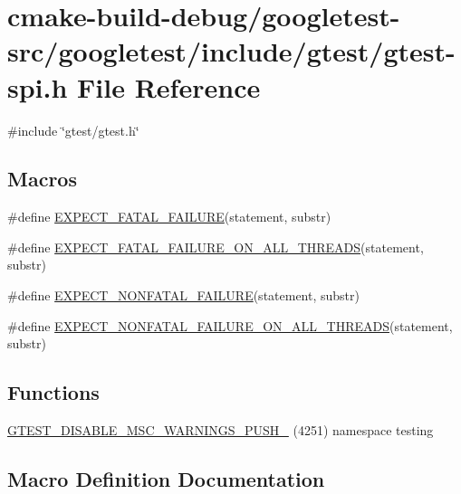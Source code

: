 \hypertarget{gtest-spi_8h}{}\section{cmake-\/build-\/debug/googletest-\/src/googletest/include/gtest/gtest-\/spi.h File Reference}
\label{gtest-spi_8h}
{\ttfamily \#include \char`\"{}gtest/gtest.\+h\char`\"{}}\newline
\subsection*{Macros}
\begin{DoxyCompactItemize}
\item 
\#define \mbox{\hyperlink{gtest-spi_8h_a819a3fd7f8b8cf24b6f1b3a26708973d}{E\+X\+P\+E\+C\+T\+\_\+\+F\+A\+T\+A\+L\+\_\+\+F\+A\+I\+L\+U\+RE}}(statement,  substr)
\item 
\#define \mbox{\hyperlink{gtest-spi_8h_ad8aac5bc859b2ddc07583636ae4f45cf}{E\+X\+P\+E\+C\+T\+\_\+\+F\+A\+T\+A\+L\+\_\+\+F\+A\+I\+L\+U\+R\+E\+\_\+\+O\+N\+\_\+\+A\+L\+L\+\_\+\+T\+H\+R\+E\+A\+DS}}(statement,  substr)
\item 
\#define \mbox{\hyperlink{gtest-spi_8h_a8376fd6821bd88fd806697355e79e138}{E\+X\+P\+E\+C\+T\+\_\+\+N\+O\+N\+F\+A\+T\+A\+L\+\_\+\+F\+A\+I\+L\+U\+RE}}(statement,  substr)
\item 
\#define \mbox{\hyperlink{gtest-spi_8h_a9f4cf1f150fe9facfc4cbf0bae646ee9}{E\+X\+P\+E\+C\+T\+\_\+\+N\+O\+N\+F\+A\+T\+A\+L\+\_\+\+F\+A\+I\+L\+U\+R\+E\+\_\+\+O\+N\+\_\+\+A\+L\+L\+\_\+\+T\+H\+R\+E\+A\+DS}}(statement,  substr)
\end{DoxyCompactItemize}
\subsection*{Functions}
\begin{DoxyCompactItemize}
\item 
\mbox{\hyperlink{gtest-spi_8h_a88f79832f9d045112a76e9da8611cc13}{G\+T\+E\+S\+T\+\_\+\+D\+I\+S\+A\+B\+L\+E\+\_\+\+M\+S\+C\+\_\+\+W\+A\+R\+N\+I\+N\+G\+S\+\_\+\+P\+U\+S\+H\+\_\+}} (4251) namespace testing
\end{DoxyCompactItemize}


\subsection{Macro Definition Documentation}
\mbox{\label{gtest-spi_8h_a819a3fd7f8b8cf24b6f1b3a26708973d}} 
